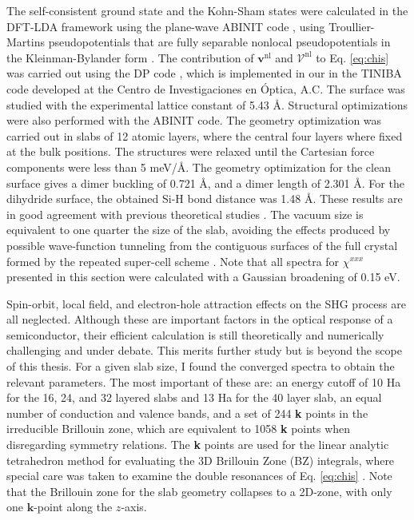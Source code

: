 The self-consistent ground state and the Kohn-Sham states were calculated in the
DFT-LDA framework using the plane-wave ABINIT code \cite{gonzeCPS09, abinit},
using Troullier-Martins pseudopotentials \cite{troullierPRB91} that are fully
separable nonlocal pseudopotentials in the Kleinman-Bylander form
\cite{kleinmanPRL82}. The contribution of $\mathbf{v}^\mathrm{nl}$ and
$\boldsymbol{\mathcal{V}}^\mathrm{nl}$ to Eq. \eqref{eq:chis} was carried out
using the DP code \cite{olevanoDP}, which is implemented in our in the TINIBA
code \cite{tiniba} developed at the Centro de Investigaciones en \'Optica, A.C.
The surface was studied with the experimental lattice constant of 5.43 \AA.
Structural optimizations were also performed with the ABINIT code. The geometry
optimization was carried out in slabs of 12 atomic layers, where the central
four layers where fixed at the bulk positions. The structures were relaxed until
the Cartesian force components were less than 5 meV/\AA. The geometry
optimization for the clean surface gives a dimer buckling of 0.721 \AA, and a
dimer length of 2.301 \AA. For the dihydride surface, the obtained Si-H bond
distance was 1.48 \AA. These results are in good agreement with previous
theoretical studies \cite{caramellaPRB09, mendozaPRB06}. The vacuum size is
equivalent to one quarter the size of the slab, avoiding the effects produced by
possible wave-function tunneling from the contiguous surfaces of the full
crystal formed by the repeated super-cell scheme \cite{mendozaPRB06}. Note that
all spectra for $\chi^{xxx}$ presented in this section were calculated with a
Gaussian broadening of 0.15 eV.

Spin-orbit, local field, and electron-hole attraction \cite{beyond} effects on
the SHG process are all neglected. Although these are important factors in the
optical response of a semiconductor, their efficient calculation is still
theoretically and numerically challenging and under debate. This merits further
study but is beyond the scope of this thesis. For a given slab size, I found the
converged spectra to obtain the relevant parameters. The most important of these
are: an energy cutoff of 10 Ha for the 16, 24, and 32 layered slabs and 13 Ha
for the 40 layer slab, an equal number of conduction and valence bands, and a
set of 244 \textbf{k} points in the irreducible Brillouin zone, which are
equivalent to 1058 \textbf{k} points when disregarding symmetry relations. The
\textbf{k} points are used for the linear analytic tetrahedron method for
evaluating the 3D Brillouin Zone (BZ) integrals, where special care was taken to
examine the double resonances of Eq. \eqref{eq:chis} \cite{nastosPRB05}. Note
that the Brillouin zone for the slab geometry collapses to a 2D-zone, with only
one $\mathbf{k}$-point along the $z$-axis.



